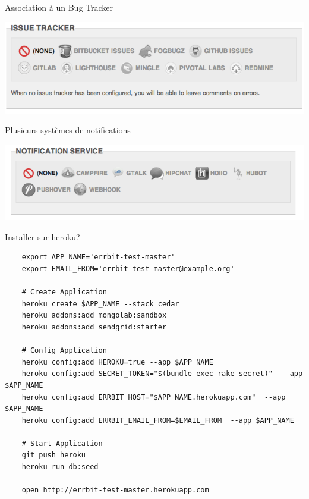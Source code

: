\documentclass{beamer}
\begin{document}
\begin{frame}
  \begin{overlayarea}{10cm}{0.5cm}
    \centering
    \huge
    Association à un Bug Tracker
    \par
  \end{overlayarea}
  \begin{overlayarea}{10cm}{3cm}
    \centering
    \vfill
    \includegraphics[width=\linewidth]{issue_tracker.png}
  \end{overlayarea}
\end{frame}

\begin{frame}
  \begin{overlayarea}{10cm}{0.5cm}
    \centering
    \huge
    Plusieurs systèmes de notifications
    \par
  \end{overlayarea}
  \begin{overlayarea}{10cm}{3cm}
    \centering
    \vfill
    \includegraphics[width=\linewidth]{service_de_notification.png}
  \end{overlayarea}
\end{frame}

\begin{frame}[fragile]
  \center{}
  \Huge
  Installer sur heroku?
  \tiny
  \begin{verbatim}
    export APP_NAME='errbit-test-master'
    export EMAIL_FROM='errbit-test-master@example.org'

    # Create Application
    heroku create $APP_NAME --stack cedar
    heroku addons:add mongolab:sandbox
    heroku addons:add sendgrid:starter

    # Config Application
    heroku config:add HEROKU=true --app $APP_NAME
    heroku config:add SECRET_TOKEN="$(bundle exec rake secret)"  --app $APP_NAME
    heroku config:add ERRBIT_HOST="$APP_NAME.herokuapp.com"  --app $APP_NAME
    heroku config:add ERRBIT_EMAIL_FROM=$EMAIL_FROM  --app $APP_NAME

    # Start Application
    git push heroku
    heroku run db:seed

    open http://errbit-test-master.herokuapp.com
  \end{verbatim}
\end{frame}
\end{document}
